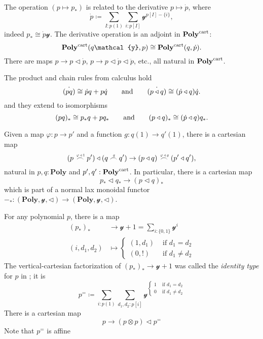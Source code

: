 \documentclass[11pt, one side, article]{memoir}
\theoremstyle{definition}
\theoremstyle{plain}
\newcommand{\Cat}[1]{\mathbf{#1}}%
\newcommand{\tn}[1]{\textnormal{#1}}
\newcommand{\yon}{{\mathcal{y}}}
\newcommand{\poly}{\Cat{Poly}}
\newcommand{\cart}{\tn{cart}}
\newcommand{\polycart}{\poly^\cart}
\newcommand{\0}{\textsf{0}}
\newcommand{\1}{\tn{\textsf{1}}}
\newcommand{\tri}{\mathbin{\triangleleft}}
\newcommand{\indexcoclscale}[1]{\scalebox{.7}{#1}}
\newcommand{\cocl}[1]{
	\scriptsize\overset{\,\indexcoclscale{$#1$}}{\frown}\normalsize
}
\newcommand{\hh}[2][]{#1 \tn{#2} #1}
\newcommand{\qqand}{\hh[\qquad]{and}}
\begin{document}
The operation $(p\mapsto p_*)$ is related to the derivative $p\mapsto\dot{p}$, where
\begin{equation}
\dot{p}\coloneqq\sum_{I:p(1)}\sum_{i:p[I]}\yon^{p[I]-\{i\}},
\end{equation}
indeed $p_*\cong\dot{p}\yon$. The derivative operation is an adjoint in $\polycart$:
\begin{equation}
  \polycart(q\yon,p)\cong
  \polycart(q,\dot{p}).
\end{equation}
There are maps $p\to p\tri\dot{p}$, $p\to p\tri\dot{p}\tri\ddot{p}$, etc., all natural in $\polycart$. 

The product and chain rules from calculus hold
\begin{equation}\label{eqn.calculus}
	\dot{(pq)}\cong \dot{p}q+p\dot{q}
	\qqand
	\dot{(p\tri q)}\cong(\dot{p}\tri q)\dot{q}.
\end{equation}
and they extend to isomorphisms 
\begin{equation}\label{eqn.calculus}
	(pq)_*\cong p_*q+pq_*
	\qqand
	(p\tri q)_*\cong(\dot{p}\tri q)q_*.
\end{equation}

Given a map $\varphi\colon p\to p'$ and a function $g\colon q(1)\to q'(1)$, there is a cartesian map
\begin{equation}
	(p\cocl{\varphi\tri1}p')\tri(q\cocl{g}q')\to
	(p\tri q)\cocl{\varphi\tri g}(p'\tri q'),
\end{equation}
natural in $p,q:\poly$ and $p',q':\polycart$. In particular, there is a cartesian map
\begin{equation}
	p_*\tri q_*\to(p\tri q)_*
\end{equation}
which is part of a normal lax monoidal functor $-_*\colon(\poly,\yon,\tri)\to(\poly,\yon,\tri)$.


For any polynomial $p$, there is a map
\begin{align}
	(p_*)_*&\to\yon+1=\sum_{i:\{0,1\}}\yon^i\\
	(i,d_1,d_2)&\mapsto
	\begin{cases}
		(1,d_1)&\text{ if } d_1=d_2 \\
		(0,!)&\text{ if }d_1\neq d_2
	\end{cases}
\end{align}
The vertical-cartesian factorization of $(p_*)_*\to\yon+1$ was called the \emph{identity type} for $p$ in \cite{aberle2024polynomial}; it is
\begin{equation}
	p^=\coloneqq\sum_{i:p(1)}\sum_{d_1,d_2:p[i]}\yon^{\begin{cases}1&\text{ if } d_1=d_2 \\0&\text{ if }d_1\neq d_2\end{cases}}
\end{equation}
There is a cartesian map
\begin{equation}
	p\to (p\otimes p)\tri p^=
\end{equation}
Note that $p^=$ is affine 
\end{document}
